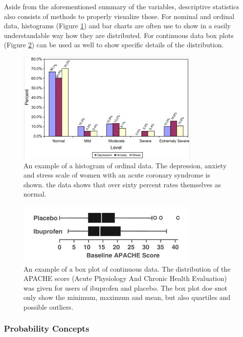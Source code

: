\documentclass[10pt,a4paper]{report}
\begin{document}
	Aside from the aforementioned summary of the variables, descriptive statistics also consists of methods to properly visualize those. For nominal and ordinal data, histograms (Figure \ref{fig:HistEx}) and bar charts are often use to show in a easily understandable way how they are distributed. For continuous data box plots (Figure \ref{fig:BoxEx}) can be used as well to show specific details of the distribution. \cite{dupont2009statistical}
	
	\begin{figure}[h!]
		\includegraphics{HistogramExample.PNG}
		\caption{An example of a histogram of ordinal data. The depression, anxiety and stress scale of women with an acute coronary syndrome is shown. the data shows that over sixty percent rates themselves as normal. \cite{FISHER200993}}
		\label{fig:HistEx}
	\end{figure}
	
	\begin{figure}[h!]
		\includegraphics{BoxplotExample.PNG}
		\caption{An example of a box plot of continuous data. The distribution of the APACHE score (Acute Physiology And Chronic Health Evaluation) was given for users of ibuprofen and placebo. The box plot doe snot only show the minimum, maximum and mean, but also quartiles and possible outliers. \cite{dupont2009statistical}}
		\label{fig:BoxEx}
	\end{figure}
	
	\subsubsection{Probability Concepts}
	
\end{document}
